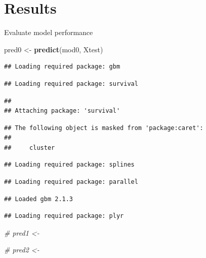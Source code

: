 \documentclass[ignorenonframetext,]{beamer}
\newenvironment{Shaded}{\begin{snugshade}}{\end{snugshade}}
\newcommand{\KeywordTok}[1]{\textcolor[rgb]{0.13,0.29,0.53}{\textbf{{#1}}}}
\newcommand{\StringTok}[1]{\textcolor[rgb]{0.31,0.60,0.02}{{#1}}}
\newcommand{\CommentTok}[1]{\textcolor[rgb]{0.56,0.35,0.01}{\textit{{#1}}}}
\newcommand{\NormalTok}[1]{{#1}}
\begin{document}
\section{Results}\label{results}

\begin{frame}[fragile]{Evaluate model performance}

\footnotesize

\begin{Shaded}
\begin{Highlighting}[]
\NormalTok{pred0 <-}\StringTok{ }\KeywordTok{predict}\NormalTok{(mod0, Xtest)}
\end{Highlighting}
\end{Shaded}

\begin{verbatim}
## Loading required package: gbm
\end{verbatim}

\begin{verbatim}
## Loading required package: survival
\end{verbatim}

\begin{verbatim}
## 
## Attaching package: 'survival'
\end{verbatim}

\begin{verbatim}
## The following object is masked from 'package:caret':
## 
##     cluster
\end{verbatim}

\begin{verbatim}
## Loading required package: splines
\end{verbatim}

\begin{verbatim}
## Loading required package: parallel
\end{verbatim}

\begin{verbatim}
## Loaded gbm 2.1.3
\end{verbatim}

\begin{verbatim}
## Loading required package: plyr
\end{verbatim}

\begin{Shaded}
\begin{Highlighting}[]
\CommentTok{# pred1 <- }

\CommentTok{# pred2 <- }
\end{Highlighting}
\end{Shaded}

\end{frame}
\end{document}
